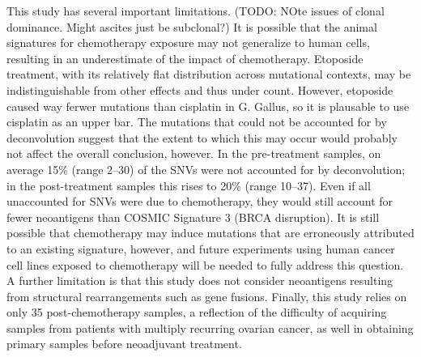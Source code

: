 This study has several important limitations. (TODO: NOte issues of clonal dominance. Might ascites just be subclonal?) It is possible that the animal signatures for chemotherapy exposure may not generalize to human cells, resulting in an underestimate of the impact of chemotherapy. Etoposide treatment, with its relatively flat distribution across mutational contexts, may be indistinguishable from other effects and thus under count. However, etoposide caused way ferwer mutations than cisplatin in G. Gallus, so it is plausable to use cisplatin as an upper bar. The mutations that could not be accounted for by deconvolution suggest that the extent to which this may occur would probably not affect the overall conclusion, however. In the pre-treatment samples, on average 15\% (range 2--30) of the SNVs were not accounted for by deconvolution; in the post-treatment samples this rises to 20\% (range 10--37). Even if all unaccounted for SNVs were due to chemotherapy, they would still account for fewer neoantigens than COSMIC Signature 3 (BRCA disruption). It is still possible that chemotherapy may induce mutations that are erroneously attributed to an existing signature, however, and future experiments using human cancer cell lines exposed to chemotherapy will be needed to fully address this question. A further limitation is that this study does not consider neoantigens resulting from structural rearrangements such as gene fusions. Finally, this study relies on only 35 post-chemotherapy samples, a reflection of the difficulty of acquiring samples from patients with multiply recurring ovarian cancer, as well in obtaining primary samples before neoadjuvant treatment.



